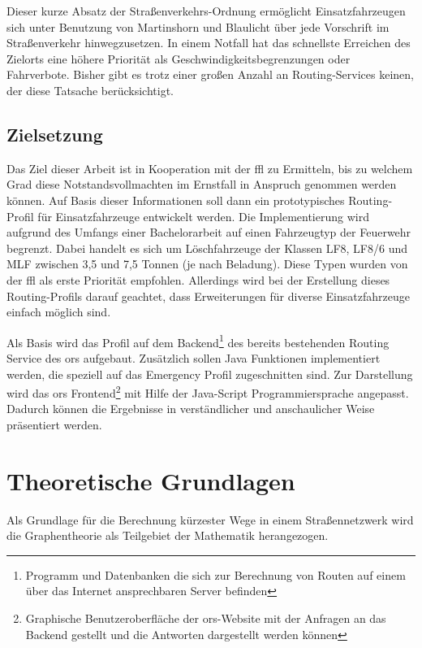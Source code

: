 \documentclass[12pt,a4paper]{article}
\begin{document}
\vspace{1.2cm}

Dieser kurze Absatz der Straßenverkehrs-Ordnung ermöglicht Einsatzfahrzeugen sich unter Benutzung von Martinshorn und Blaulicht über jede Vorschrift im Straßenverkehr hinwegzusetzen. In einem Notfall hat das schnellste Erreichen des Zielorts eine höhere Priorität als Geschwindigkeitsbegrenzungen oder Fahrverbote. Bisher gibt es trotz einer großen Anzahl an Routing-Services keinen, der diese Tatsache berücksichtigt. 


\subsection{Zielsetzung}
Das Ziel dieser Arbeit ist in Kooperation mit der \gls{ffl} zu Ermitteln, bis zu welchem Grad diese Notstandsvollmachten im Ernstfall in Anspruch genommen werden können. Auf Basis dieser Informationen soll dann ein prototypisches Routing-Profil für Einsatzfahrzeuge entwickelt werden. Die Implementierung wird aufgrund des Umfangs einer Bachelorarbeit auf einen Fahrzeugtyp der Feuerwehr begrenzt. Dabei handelt es sich um Löschfahrzeuge der Klassen LF8, LF8/6 und MLF zwischen 3,5 und 7,5 Tonnen (je nach Beladung). Diese Typen wurden von der \gls{ffl} als erste Priorität empfohlen. Allerdings wird bei der Erstellung dieses Routing-Profils darauf geachtet, dass Erweiterungen für diverse Einsatzfahrzeuge einfach möglich sind.
\vspace{0.5cm}

Als Basis wird das Profil auf dem Backend\footnote{Programm und Datenbanken die sich zur Berechnung von Routen auf einem über das Internet ansprechbaren Server befinden} des bereits bestehenden Routing Service des \gls{ors} aufgebaut. Zusätzlich sollen Java Funktionen implementiert werden, die speziell auf das Emergency Profil zugeschnitten sind. Zur Darstellung wird das \gls{ors} Frontend\footnote{Graphische Benutzeroberfläche der \gls{ors}-Website mit der Anfragen an das Backend gestellt und die Antworten dargestellt werden können} mit Hilfe der Java-Script Programmiersprache angepasst. Dadurch können die Ergebnisse in verständlicher und anschaulicher Weise präsentiert werden.

\newpage
\section{Theoretische Grundlagen}

Als Grundlage für die Berechnung kürzester Wege in einem Straßennetzwerk wird die Graphentheorie als Teilgebiet der Mathematik herangezogen. 
\end{document}
